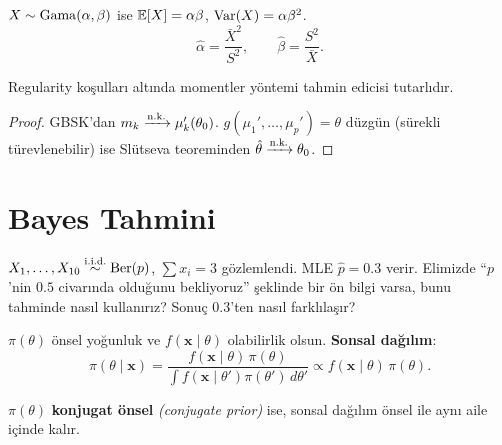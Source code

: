 \begin{ornek}\label{ex:gama_momentler}
$X\sim\operatorname{Gama}(\alpha,\beta)$ ise $\mathbb{E}[X]=\alpha\beta$, $\operatorname{Var}(X)=\alpha\beta^2$.
\[
  \hat\alpha = \frac{\bar{X}^2}{S^2}, \qquad \hat\beta = \frac{S^2}{\bar{X}}.
\]
\end{ornek}

\begin{teorem}
Regularity koşulları altında momentler yöntemi tahmin edicisi tutarlıdır.
\end{teorem}

\begin{proof}
GBSK'dan $m_k \xrightarrow{\text{n.k.}} \mu_k'(\theta_0)$. $g(\mu_1',\ldots,\mu_p')=\theta$ düzgün (sürekli türevlenebilir) ise Slütseva teoreminden $\hat\theta \xrightarrow{\text{n.k.}} \theta_0$.
\end{proof}

\section{Bayes Tahmini}
\label{sec:bayes_tahmin}

\begin{kesif}
$X_1,\ldots,X_{10} \overset{\text{i.i.d.}}{\sim} \mathrm{Ber}(p)$, $\sum x_i = 3$ gözlemlendi.
MLE $\hat{p} = 0.3$ verir. Elimizde ``$p$'nin $0.5$ civarında olduğunu bekliyoruz''
şeklinde bir ön bilgi varsa, bunu tahminde nasıl kullanırız?
Sonuç $0.3$'ten nasıl farklılaşır?
\end{kesif}

\begin{tanim}\label{def:onsel_sonsal}
$\pi(\theta)$ önsel yoğunluk ve $f(\mathbf{x}\mid\theta)$ olabilirlik olsun. \textbf{Sonsal dağılım}:
\[
  \pi(\theta\mid\mathbf{x}) = \frac{f(\mathbf{x}\mid\theta)\,\pi(\theta)}{\int f(\mathbf{x}\mid\theta')\pi(\theta')\,d\theta'} \propto f(\mathbf{x}\mid\theta)\,\pi(\theta).
\]
\end{tanim}

\begin{tanim}\label{def:konjugat_onsel}
$\pi(\theta)$ \textbf{konjugat önsel} \emph{(conjugate prior)} ise, sonsal dağılım önsel ile aynı aile içinde kalır.
\end{tanim}

